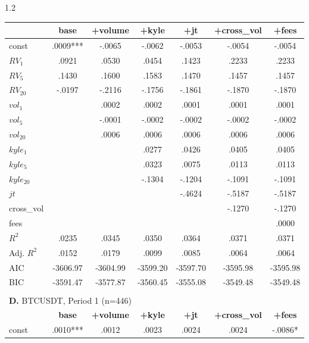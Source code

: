 \documentclass[10pt]{article}
\begin{document}
\begin{setstretch}{1.2}
\begin{small}
\begin{longtable}{l*{6}{c}}
& \textbf{base} & \textbf{+volume} & \textbf{+kyle} & \textbf{+jt} & \textbf{+cross\_vol} & \textbf{+fees} \\
\hline
const & \hfil .0009*** & \hfil -.0065 & \hfil -.0062 & \hfil -.0053 & \hfil -.0054 & \hfil -.0054 \\
$RV_1$ & \hfil .0921 & \hfil .0530 & \hfil .0454 & \hfil .1423 & \hfil .2233 & \hfil .2233 \\
$RV_5$ & \hfil .1430 & \hfil .1600 & \hfil .1583 & \hfil .1470 & \hfil .1457 & \hfil .1457 \\
$RV_{20}$ & \hfil -.0197 & \hfil -.2116 & \hfil -.1756 & \hfil -.1861 & \hfil -.1870 & \hfil -.1870 \\
$vol_1$ & & \hfil .0002 & \hfil .0002 & \hfil .0001 & \hfil .0001 & \hfil .0001 \\
$vol_5$ & & \hfil -.0001 & \hfil -.0002 & \hfil -.0002 & \hfil -.0002 & \hfil -.0002 \\
$vol_{20}$ & & \hfil .0006 & \hfil .0006 & \hfil .0006 & \hfil .0006 & \hfil .0006 \\
$kyle_1$ & & & \hfil .0277 & \hfil .0426 & \hfil .0405 & \hfil .0405 \\
$kyle_5$ & & & \hfil .0323 & \hfil .0075 & \hfil .0113 & \hfil .0113 \\
$kyle_{20}$ & & & \hfil -.1304 & \hfil -.1204 & \hfil -.1091 & \hfil -.1091 \\
$jt$ & & & & \hfil -.4624 & \hfil -.5187 & \hfil -.5187 \\
cross\_vol & & & & & \hfil -.1270 & \hfil -.1270 \\
fees & & & & & & \hfil .0000 \\
\hline
$R^2$ & \hfil .0235 & \hfil .0345 & \hfil .0350 & \hfil .0364 & \hfil .0371 & \hfil .0371 \\
Adj. $R^2$ & \hfil .0152 & \hfil .0179 & \hfil .0099 & \hfil .0085 & \hfil .0064 & \hfil .0064 \\
AIC & \hfil -3606.97 & \hfil -3604.99 & \hfil -3599.20 & \hfil -3597.70 & \hfil -3595.98 & \hfil -3595.98 \\
BIC & \hfil -3591.47 & \hfil -3577.87 & \hfil -3560.45 & \hfil -3555.08 & \hfil -3549.48 & \hfil -3549.48 \\
\hline
\\[2pt]
\multicolumn{7}{l}{\textbf{D.} BTCUSDT, Period 1 (n=446)} \\
& \textbf{base} & \textbf{+volume} & \textbf{+kyle} & \textbf{+jt} & \textbf{+cross\_vol} & \textbf{+fees} \\
\hline
const & \hfil .0010*** & \hfil .0012 & \hfil .0023 & \hfil .0024 & \hfil .0024 & \hfil -.0086* \\

\end{longtable}
\end{small}
\end{setstretch}
\end{document}
